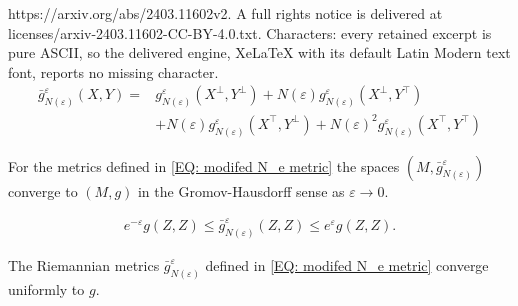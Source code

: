 \documentclass[10pt,a4paper]{amsart}
\begin{document}
https://arxiv.org/abs/2403.11602v2. A full rights notice is delivered at licenses/arxiv-2403.11602-CC-BY-4.0.txt. Characters: every retained excerpt is pure ASCII, so the delivered engine, XeLaTeX with its default Latin Modern text font, reports no missing character.
\begin{equation}\label{EQ: modifed N_e metric}
\begin{split}
\bar{g}^\varepsilon_{N(\varepsilon)}(X,Y) =& g^\varepsilon_{N(\varepsilon)}(X^\perp,Y^\perp)+N(\varepsilon) g^\varepsilon_{N(\varepsilon)}(X^\perp,Y^\top)\\
&+N(\varepsilon) g^\varepsilon_{N(\varepsilon)}(X^\top,Y^\perp)+ N(\varepsilon)^2 g^\varepsilon_{N(\varepsilon)}(X^\top,Y^\top)
\end{split}
\end{equation}

\begin{lemma}\th\label{L: modified metric converge GH to g}
For the metrics defined in \eqref{EQ: modifed N_e metric} the spaces $(M,\bar{g}^\varepsilon_{N(\varepsilon)})$ converge to $(M,g)$ in the Gromov-Hausdorff sense as $\varepsilon\to 0$.
\end{lemma}

\begin{align}
e^{-\varepsilon}g(Z,Z)\leq \bar{g}^\varepsilon_{N(\varepsilon)}(Z,Z) \leq e^{\varepsilon}g(Z,Z).\label{EQ: Converges of bar g}
\end{align}

\begin{lemma}\th\label{L: uniform convergence of bar g to g }
The Riemannian metrics $\bar{g}^\varepsilon_{N(\varepsilon)}$ defined in \eqref{EQ: modifed N_e metric} converge uniformly to $g$. 
\end{lemma}
\end{document}
